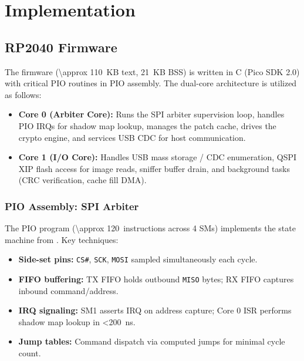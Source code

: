 \section{Implementation}
\label{sec:implementation}

\subsection{RP2040 Firmware}
The \vbfc firmware (\SI{\approx 110}{KB} text, \SI{21}{KB} BSS) is written in C (Pico SDK 2.0) with critical \ac{PIO} routines in \ac{PIO} assembly. The dual-core architecture is utilized as follows:
\begin{itemize}
    \item \textbf{Core 0 (Arbiter Core):} Runs the \ac{SPI} arbiter supervision loop, handles \ac{PIO} IRQs for shadow map lookup, manages the patch cache, drives the crypto engine, and services USB CDC for host communication.
    \item \textbf{Core 1 (I/O Core):} Handles USB mass storage / CDC enumeration, \ac{QSPI} XIP flash access for image reads, sniffer buffer drain, and background tasks (CRC verification, cache fill DMA).
\end{itemize}

\subsubsection{PIO Assembly: SPI Arbiter}
The \ac{PIO} program (\SI{\approx 120}{instructions} across 4 SMs) implements the state machine from . Key techniques:
\begin{itemize}
    \item \textbf{Side-set pins:} \texttt{CS\#}, \texttt{SCK}, \texttt{MOSI} sampled simultaneously each cycle.
    \item \textbf{FIFO buffering:} TX FIFO holds outbound \texttt{MISO} bytes; RX FIFO captures inbound command/address.
    \item \textbf{IRQ signaling:} SM1 asserts IRQ on address capture; Core 0 ISR performs shadow map lookup in \SI{<200}{ns}.
    \item \textbf{Jump tables:} Command dispatch via computed jumps for minimal cycle count.
\end{itemize}

